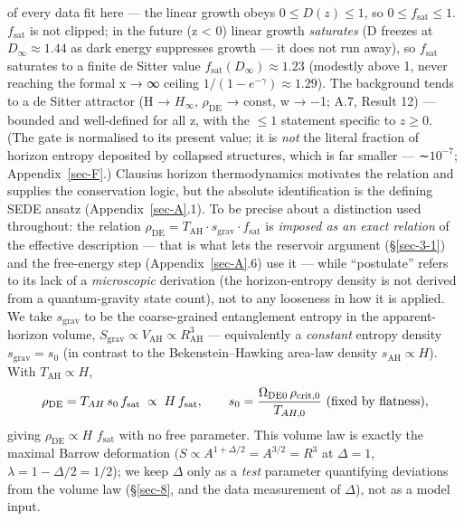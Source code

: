 \documentclass[preprint,12pt]{elsarticle}
\begin{document}
of every data fit here --- the linear growth obeys
\(0 \leq  D(z) \leq  1\), so \(0 \leq  f_{\mathrm{sat}} \leq  1\).
\(f_{\mathrm{sat}}\) is not clipped; in the future (z \textless{} 0)
linear growth \emph{saturates} (D freezes at \(D_\infty  \approx  1.44\)
as dark energy suppresses growth --- it does not run away), so
\(f_{\mathrm{sat}}\) saturates to a finite de Sitter value
\(f_{\mathrm{sat}}(D_\infty ) \approx  1.23\) (modestly above 1, never
reaching the formal x → ∞ ceiling \(1/(1-e^{-\gamma }) \approx  1.29\)).
The background tends to a de Sitter attractor (H → \(H_\infty\),
\(\rho _\mathrm{DE}\) → const, w → −1; A.7, Result 12) --- bounded and
well-defined for all z, with the \(\leq  1\) statement specific to
\(z \geq  0\). (The gate is normalised to its present value; it is
\emph{not} the literal fraction of horizon entropy deposited by
collapsed structures, which is far smaller --- ∼\(10^{-7}\);
Appendix~\ref{sec-F}.) Clausius horizon thermodynamics motivates the
relation and supplies the conservation logic, but the absolute
identification is the defining SEDE ansatz (Appendix~\ref{sec-A}.1). To
be precise about a distinction used throughout: the relation
\(\rho _\mathrm{DE} = T_\mathrm{AH}\cdot s_{\mathrm{grav}}\cdot f_{\mathrm{sat}}\)
is \emph{imposed as an exact relation} of the effective description ---
that is what lets the reservoir argument (§\ref{sec-3-1}) and the
free-energy step (Appendix~\ref{sec-A}.6) use it --- while ``postulate''
refers to its lack of a \emph{microscopic} derivation (the
horizon-entropy density is not derived from a quantum-gravity state
count), not to any looseness in how it is applied. We take
\(s_{\mathrm{grav}}\) to be the coarse-grained entanglement entropy in
the apparent-horizon volume,
\(S_{\mathrm{grav}} \propto  V_\mathrm{AH} \propto  R_\mathrm{AH}^{3}\)
--- equivalently a \emph{constant} entropy density
\(s_{\mathrm{grav}} = s_{0}\) (in contrast to the Bekenstein--Hawking
area-law density \(s_\mathrm{AH} \propto  H\)). With
\(T_\mathrm{AH} \propto  H\),
\begin{equation}\rho_{\rm DE} = T_{AH}\,s_0\,f_{\rm sat} \;\propto\; H\,f_{\rm sat}, \qquad
s_0 = \frac{\Omega_{\rm DE0}\,\rho_{\rm crit,0}}{T_{AH,0}}\ \text{(fixed by flatness)},\end{equation}
giving \(\rho _\mathrm{DE} \propto  H\) \(f_{\mathrm{sat}}\) with no
free parameter. This volume law is exactly the maximal Barrow
deformation \((S \propto  A^{1+\Delta /2} = A^{3/2} = R^{3}\) at
\(\Delta =1\), \(\lambda  = 1 - \Delta /2 = 1/2\)); we keep \(\Delta\)
only as a \emph{test} parameter quantifying deviations from the volume
law (§\ref{sec-8}, and the data measurement of \(\Delta\)), not as a
model input.
\end{document}
